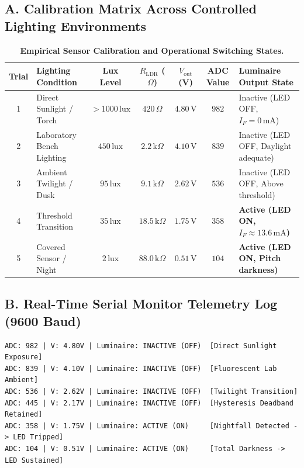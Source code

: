 \documentclass[10pt,a4paper]{article}
\begin{document}
\subsection*{A. Calibration Matrix Across Controlled Lighting Environments}
\begin{table}[H]
\centering
\footnotesize
\renewcommand{\arraystretch}{1.12}
\begin{tabularx}{\textwidth}{|c|p{3.7cm}|c|c|c|c|>{\raggedright\arraybackslash}X|}
\hline
\textbf{Trial} & \textbf{Lighting Condition} & \textbf{Lux Level} & \textbf{$R_{\text{LDR}}$ ($\Omega$)} & \textbf{$V_{\text{out}}$ (V)} & \textbf{ADC Value} & \textbf{Luminaire Output State} \\
\hline
1 & Direct Sunlight / Torch & $> 1000\,\text{lux}$ & $420\,\Omega$ & $4.80\,\text{V}$ & $982$ & Inactive (LED OFF, $I_F = 0\,\text{mA}$) \\
2 & Laboratory Bench Lighting & $450\,\text{lux}$ & $2.2\,\text{k}\Omega$ & $4.10\,\text{V}$ & $839$ & Inactive (LED OFF, Daylight adequate) \\
3 & Ambient Twilight / Dusk & $95\,\text{lux}$ & $9.1\,\text{k}\Omega$ & $2.62\,\text{V}$ & $536$ & Inactive (LED OFF, Above threshold) \\
4 & Threshold Transition & $35\,\text{lux}$ & $18.5\,\text{k}\Omega$ & $1.75\,\text{V}$ & $358$ & \textbf{Active (LED ON, $I_F \approx 13.6\,\text{mA}$)} \\
5 & Covered Sensor / Night & $2\,\text{lux}$ & $88.0\,\text{k}\Omega$ & $0.51\,\text{V}$ & $104$ & \textbf{Active (LED ON, Pitch darkness)} \\
\hline
\end{tabularx}
\caption{\textbf{Empirical Sensor Calibration and Operational Switching States.}}
\end{table}

\subsection*{B. Real-Time Serial Monitor Telemetry Log (9600 Baud)}
\begin{lstlisting}[style=bwTerminal]
ADC: 982 | V: 4.80V | Luminaire: INACTIVE (OFF)  [Direct Sunlight Exposure]
ADC: 839 | V: 4.10V | Luminaire: INACTIVE (OFF)  [Fluorescent Lab Ambient]
ADC: 536 | V: 2.62V | Luminaire: INACTIVE (OFF)  [Twilight Transition]
ADC: 445 | V: 2.17V | Luminaire: INACTIVE (OFF)  [Hysteresis Deadband Retained]
ADC: 358 | V: 1.75V | Luminaire: ACTIVE (ON)     [Nightfall Detected -> LED Tripped]
ADC: 104 | V: 0.51V | Luminaire: ACTIVE (ON)     [Total Darkness -> LED Sustained]
\end{lstlisting}
\end{document}

